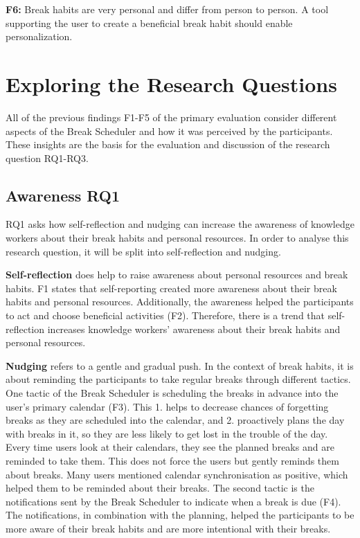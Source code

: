 \documentclass{hasel_thesis}
\begin{document}
\begin{tcolorbox}[colback=white!5!white,colframe=black!75!black]
 \textbf{F6:} Break habits are very personal and differ from person to person. A tool supporting the user to create a beneficial break habit should enable personalization.
\end{tcolorbox}

\section{Exploring the Research Questions}
All of the previous findings F1-F5 of the primary evaluation consider different aspects of the Break Scheduler and how it was perceived by the participants. These insights are the basis for the evaluation and discussion of the research question RQ1-RQ3.

\subsection{Awareness RQ1} \label{RQ1} %

RQ1 asks how self-reflection and nudging can increase the awareness of knowledge workers about their break habits and personal resources. In order to analyse this research question, it will be split into self-reflection and nudging. 

\textbf{Self-reflection} does help to raise awareness about personal resources and break habits. F1 states that self-reporting created more awareness about their break habits and personal resources. Additionally, the awareness helped the participants to act and choose beneficial activities (F2). Therefore, there is a trend that self-reflection increases knowledge workers' awareness about their break habits and personal resources. 

\textbf{Nudging} refers to a gentle and gradual push. In the context of break habits, it is about reminding the participants to take regular breaks through different tactics. One tactic of the Break Scheduler is scheduling the breaks in advance into the user's primary calendar (F3). This 1. helps to decrease chances of forgetting breaks as they are scheduled into the calendar, and 2. proactively plans the day with breaks in it, so they are less likely to get lost in the trouble of the day. Every time users look at their calendars, they see the planned breaks and are reminded to take them. This does not force the users but gently reminds them about breaks. Many users mentioned calendar synchronisation as positive, which helped them to be reminded about their breaks. The second tactic is the notifications sent by the Break Scheduler to indicate when a break is due (F4). The notifications, in combination with the planning, helped the participants to be more aware of their break habits and are more intentional with their breaks. 
\end{document}
